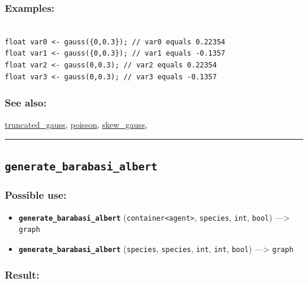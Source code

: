 \documentclass[]{book}
\providecommand{\tightlist}{%
  \setlength{\itemsep}{0pt}\setlength{\parskip}{0pt}}
\theoremstyle{definition}
\theoremstyle{definition}
\theoremstyle{definition}
\theoremstyle{remark}
\begin{document}
\subsubsection{Examples:}\label{examples-135}

\begin{verbatim}
 
float var0 <- gauss({0,0.3}); // var0 equals 0.22354 
float var1 <- gauss({0,0.3}); // var1 equals -0.1357 
float var2 <- gauss(0,0.3); // var2 equals 0.22354 
float var3 <- gauss(0,0.3); // var3 equals -0.1357
\end{verbatim}

\subsubsection{See also:}\label{see-also-102}

\href{operators-s-to-z.html\#truncated_gauss}{truncated\_gauss},
\href{operators-n-to-r.html\#poisson}{poisson},
\href{operators-s-to-z.html\#skew_gauss}{skew\_gauss},

\begin{center}\rule{0.5\linewidth}{\linethickness}\end{center}

\subsection{\texorpdfstring{\texttt{generate\_barabasi\_albert}}{generate\_barabasi\_albert}}\label{generate_barabasi_albert}

\subsubsection{Possible use:}\label{possible-use-186}

\begin{itemize}
\tightlist
\item
  \textbf{\texttt{generate\_barabasi\_albert}}
  (\texttt{container\textless{}agent\textgreater{}}, \texttt{species},
  \texttt{int}, \texttt{bool}) ---\textgreater{} \texttt{graph}
\item
  \textbf{\texttt{generate\_barabasi\_albert}} (\texttt{species},
  \texttt{species}, \texttt{int}, \texttt{int}, \texttt{bool})
  ---\textgreater{} \texttt{graph}
\end{itemize}

\subsubsection{Result:}\label{result-180}
\end{document}
